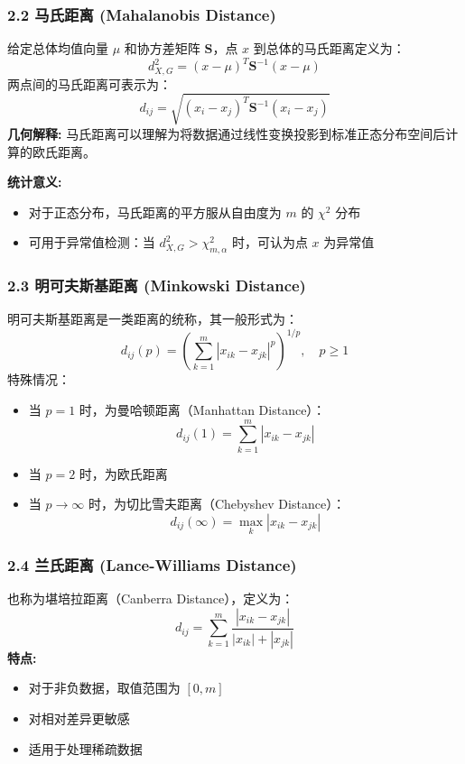 \subsubsection{2.2 马氏距离 (Mahalanobis Distance)}
给定总体均值向量 $\mu$ 和协方差矩阵 $\mathbf{S}$，点 $x$ 到总体的马氏距离定义为：
\[
d^2_{X,G} = (x - \mu)^T \mathbf{S}^{-1} (x - \mu)
\]
两点间的马氏距离可表示为：
\[
d_{ij} = \sqrt{(x_i - x_j)^T \mathbf{S}^{-1} (x_i - x_j)}
\]
\textbf{几何解释:} 马氏距离可以理解为将数据通过线性变换投影到标准正态分布空间后计算的欧氏距离。

\textbf{统计意义:} 
\begin{itemize}
    \item 对于正态分布，马氏距离的平方服从自由度为 $m$ 的 $\chi^2$ 分布
    \item 可用于异常值检测：当 $d^2_{X,G} > \chi^2_{m,\alpha}$ 时，可认为点 $x$ 为异常值
\end{itemize}

\subsubsection{2.3 明可夫斯基距离 (Minkowski Distance)}
明可夫斯基距离是一类距离的统称，其一般形式为：
\[
d_{ij}(p) = \left(\sum_{k=1}^m |x_{ik} - x_{jk}|^p\right)^{1/p}, \quad p \geq 1
\]
特殊情况：
\begin{itemize}
    \item 当 $p = 1$ 时，为曼哈顿距离（Manhattan Distance）：
    \[
    d_{ij}(1) = \sum_{k=1}^m |x_{ik} - x_{jk}|
    \]
    \item 当 $p = 2$ 时，为欧氏距离
    \item 当 $p \to \infty$ 时，为切比雪夫距离（Chebyshev Distance）：
    \[
    d_{ij}(\infty) = \max_{k} |x_{ik} - x_{jk}|
    \]
\end{itemize}

\subsubsection{2.4 兰氏距离 (Lance-Williams Distance)}
也称为堪培拉距离（Canberra Distance），定义为：
\[
d_{ij} = \sum_{k=1}^m \frac{|x_{ik} - x_{jk}|}{|x_{ik}| + |x_{jk}|}
\]
\textbf{特点:}
\begin{itemize}
    \item 对于非负数据，取值范围为 $[0,m]$
    \item 对相对差异更敏感
    \item 适用于处理稀疏数据
\end{itemize}

